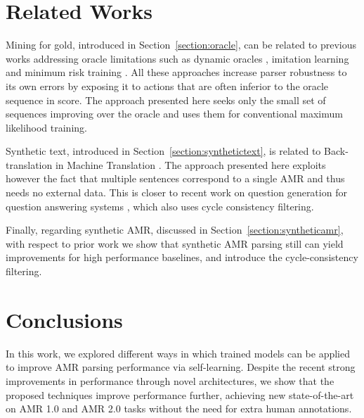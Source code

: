 \documentclass[11pt,a4paper]{article}
\begin{document}
 
\section{Related Works}
Mining for gold, introduced in Section~\ref{section:oracle}, can be related to previous works addressing oracle limitations such as dynamic oracles \cite{goldberg-nivre-2012-dynamic,ballesteros-etal-2016-training}, imitation learning \cite{goodman-etal-2016-noise} and minimum risk training \cite{naseem-etal-2019-rewarding}. All these approaches increase parser robustness to its own errors by exposing it to actions that are often inferior to the oracle sequence in score. The approach presented here seeks only the small set of sequences improving over the oracle and uses them for conventional maximum likelihood training.

Synthetic text, introduced in Section~\ref{section:synthetictext}, is related to Back-translation in Machine Translation \cite{sennrich-etal-2016-improving}. The approach presented here exploits however the fact that multiple sentences correspond to a single AMR and thus needs no external data. This is closer to recent work on question generation for question answering systems \cite{alberti-etal-2019-synthetic}, which also uses cycle consistency filtering. 

Finally, regarding synthetic AMR, discussed in Section~\ref{section:syntheticamr}, with respect to prior work \cite{konstas2017neural, noordbos2017amr} we show that synthetic AMR parsing still can yield improvements for high performance baselines, and introduce the cycle-consistency filtering.
 
\section{Conclusions}
\label{section:conclusions}
In this work\footnotemark{}, we explored different ways in which trained models can be applied to improve AMR parsing performance via self-learning. Despite the recent strong improvements in performance through novel architectures, we show that the proposed techniques improve performance further, achieving new state-of-the-art on AMR 1.0 and AMR 2.0 tasks without the need for extra human annotations.
\end{document}
